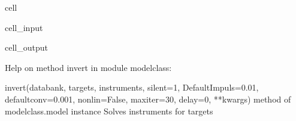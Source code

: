 \documentclass[letterpaper,10pt,english]{jupyterBook}
\begin{document}
\begin{sphinxuseclass}{cell}\begin{sphinxVerbatimInput}

\begin{sphinxuseclass}{cell_input}
\begin{sphinxVerbatim}[commandchars=\\\{\}]
\end{sphinxVerbatim}

\end{sphinxuseclass}\end{sphinxVerbatimInput}
\begin{sphinxVerbatimOutput}

\begin{sphinxuseclass}{cell_output}
\begin{sphinxVerbatim}[commandchars=\\\{\}]
Help on method invert in module modelclass:

invert(databank, targets, instruments, silent=1, DefaultImpuls=0.01, defaultconv=0.001, nonlin=False, maxiter=30, delay=0, **kwargs) method of modelclass.model instance
    Solves instruments for targets
\end{sphinxVerbatim}

\end{sphinxuseclass}\end{sphinxVerbatimOutput}

\end{sphinxuseclass}
\end{document}
